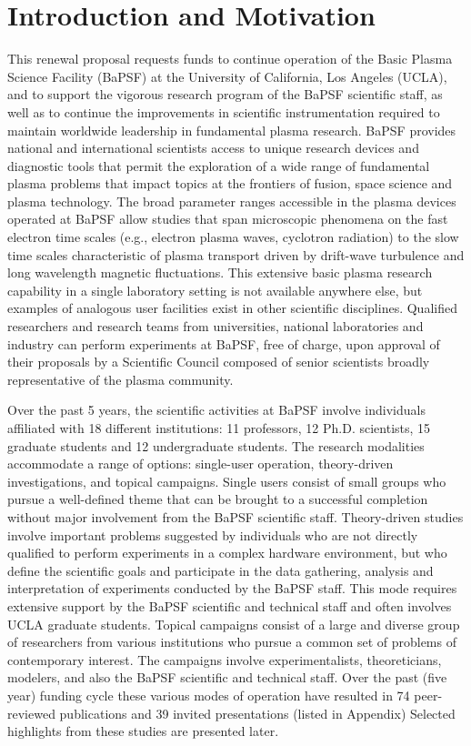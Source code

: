 \documentclass[11pt]{article}
\date{}
\title{}
\begin{document}
\section{Introduction and Motivation}

This renewal proposal requests funds to continue operation of the Basic
Plasma Science Facility (BaPSF) at the University of California, Los
Angeles (UCLA), and to support the vigorous research program of the
BaPSF scientific staff, as well as to continue the improvements in
scientific instrumentation required to maintain worldwide leadership in
fundamental plasma research.  BaPSF provides national and international scientists access to unique
research devices and diagnostic tools that permit the exploration of a
wide range of fundamental plasma problems that impact topics at the
frontiers of fusion, space science and plasma technology. The broad
parameter ranges accessible in the plasma devices operated at BaPSF
allow studies that span microscopic phenomena on the fast electron time
scales (e.g., electron plasma waves, cyclotron radiation) to the slow
time scales characteristic of plasma transport driven by drift-wave
turbulence and long wavelength magnetic fluctuations. This extensive
basic plasma research capability in a single laboratory setting is not
available anywhere else, but examples of analogous user facilities exist
in other scientific disciplines. Qualified researchers and research
teams from universities, national laboratories and industry can perform
experiments at BaPSF, free of charge, upon approval of their proposals
by a Scientific Council composed of senior scientists broadly
representative of the plasma community.

Over the past 5 years, the scientific activities at BaPSF involve
individuals affiliated with 18 different institutions: 11 professors,
12 Ph.D. scientists, 15 graduate students and 12 undergraduate
students.  The research modalities accommodate a range of options:
single-user operation, theory-driven investigations, and topical
campaigns. Single users consist of small groups who pursue a
well-defined theme that can be brought to a successful completion
without major involvement from the BaPSF scientific
staff. Theory-driven studies involve important problems suggested by
individuals who are not directly qualified to perform experiments in a
complex hardware environment, but who define the scientific goals and
participate in the data gathering, analysis and interpretation of
experiments conducted by the BaPSF staff. This mode requires extensive
support by the BaPSF scientific and technical staff and often involves
UCLA graduate students. Topical campaigns consist of a large and
diverse group of researchers from various institutions who pursue a
common set of problems of contemporary interest. The campaigns involve
experimentalists, theoreticians, modelers, and also the BaPSF
scientific and technical staff. Over the past (five year) funding
cycle these various modes of operation have resulted in 74 peer-reviewed
publications and 39 invited presentations (listed in Appendix)
Selected highlights from these studies are presented later.
\end{document}
